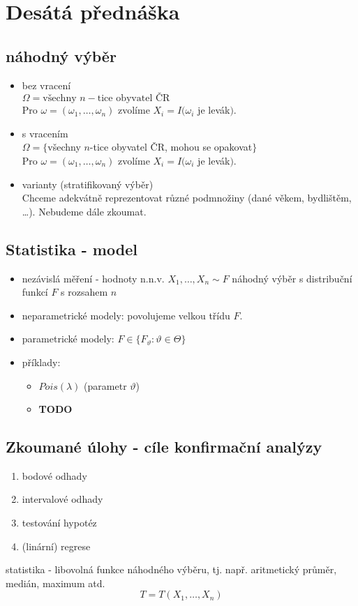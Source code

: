 \documentclass[../main.tex]{subfiles}
\begin{document}
\section{Desátá přednáška}

\subsection{náhodný výběr}
\begin{itemize}
    \item bez vracení \\
    $\Omega = {\text{všechny }n-\text{tice obyvatel ČR}}$\\
    Pro $\omega = (\omega_1,\dots, \omega_n)$ zvolíme $X_i = I(\omega_i$ je levák$)$.
    \item s vracením \\
    $\Omega = \{$všechny $n$-tice obyvatel ČR, mohou se opakovat$\}$\\
    Pro $\omega = (\omega_1,\dots,\omega_n)$ zvolíme $X_i = I(\omega_i$ je levák$)$.
    \item varianty (stratifikovaný výběr)\\
    Chceme adekvátně reprezentovat různé podmnožiny
    (dané věkem, bydlištěm, \dots ).
    Nebudeme dále zkoumat.
\end{itemize}

\subsection{Statistika - model}
\begin{itemize}
    \item nezávislá měření - hodnoty n.n.v. $X_1,\dots,X_n \sim F$ náhodný výběr s distribuční funkcí $F$ s rozsahem $n$
    \item neparametrické modely: povolujeme velkou třídu $F$.
    \item parametrické modely: $F \in \{F_\vartheta: \vartheta \in \Theta\}$
    \item příklady:
    \begin{itemize}
        \item $Pois(\lambda)$ (parametr $\vartheta$)
        \item \textbf{TODO}
    \end{itemize}
\end{itemize}
\subsection{Zkoumané úlohy - cíle konfirmační analýzy}
\begin{enumerate}
    \item bodové odhady
    \item intervalové odhady
    \item testování hypotéz
    \item (linární) regrese
\end{enumerate}
\begin{definition}
    statistika - libovolná funkce náhodného výběru, tj. např. aritmetický průměr, medián, maximum atd.
    \[ T = T(X_1, \dots , X_n) \]
\end{definition}
\end{document}
